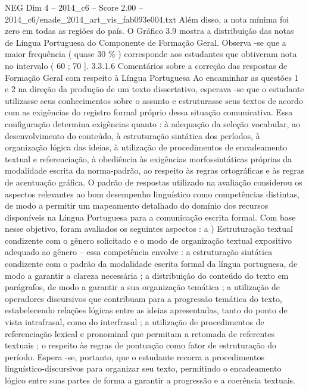 \begin{textsample}{NEG Dim 4 – 2014\_c6 – Score 2.00 – 2014\_c6/enade\_2014\_art\_vis\_fab093e004.txt}
Além disso, a nota mínima foi zero em todas as regiões do país.
O Gráfico 3.9 mostra a distribuição das notas de Língua Portuguesa do Componente de Formação Geral.
Observa -se que a maior frequência ( quase 30 \% ) corresponde aos estudantes que obtiveram nota no intervalo ( 60 ; 70 ]. 3.3.1.6 Comentários sobre a correção das respostas de Formação Geral com respeito à Língua Portuguesa Ao encaminhar as questões 1 e 2 na direção da produção de um texto dissertativo, esperava -se que o estudante utilizasse seus conhecimentos sobre o assunto e estruturasse seus textos de acordo com as exigências do registro formal próprio dessa situação comunicativa.
Essa configuração determina exigências quanto : à adequação da seleção vocabular, ao desenvolvimento do conteúdo, à estruturação sintática dos períodos, à organização lógica das ideias, à utilização de procedimentos de encadeamento textual e referenciação, à obediência às exigências morfossintáticas próprias da modalidade escrita da norma-padrão, ao respeito às regras ortográficas e às regras de acentuação gráfica.
O padrão de respostas utilizado na avaliação considerou os aspectos relevantes ao bom desempenho linguístico como competências distintas, de modo a permitir um mapeamento detalhado do domínio dos recursos disponíveis na Língua Portuguesa para a comunicação escrita formal.
Com base nesse objetivo, foram avaliados os seguintes aspectos : a ) Estruturação textual condizente com o gênero solicitado e o modo de organização textual expositivo adequado ao gênero – essa competência envolve : a estruturação sintática condizente com o padrão da modalidade escrita formal da língua portuguesa, de modo a garantir a clareza necessária ; a distribuição do conteúdo do texto em parágrafos, de modo a garantir a sua organização temática ; a utilização de operadores discursivos que contribuam para a progressão temática do texto, estabelecendo relações lógicas entre as ideias apresentadas, tanto do ponto de vista intrafrasal, como do interfrasal ; a utilização de procedimentos de referenciação lexical e pronominal que permitam a retomada de referentes textuais ; o respeito às regras de pontuação como fator de estruturação do período.
Espera -se, portanto, que o estudante recorra a procedimentos linguístico-discursivos para organizar seu texto, permitindo o encadeamento lógico entre suas partes de forma a garantir a progressão e a coerência textuais.

\end{textsample}
